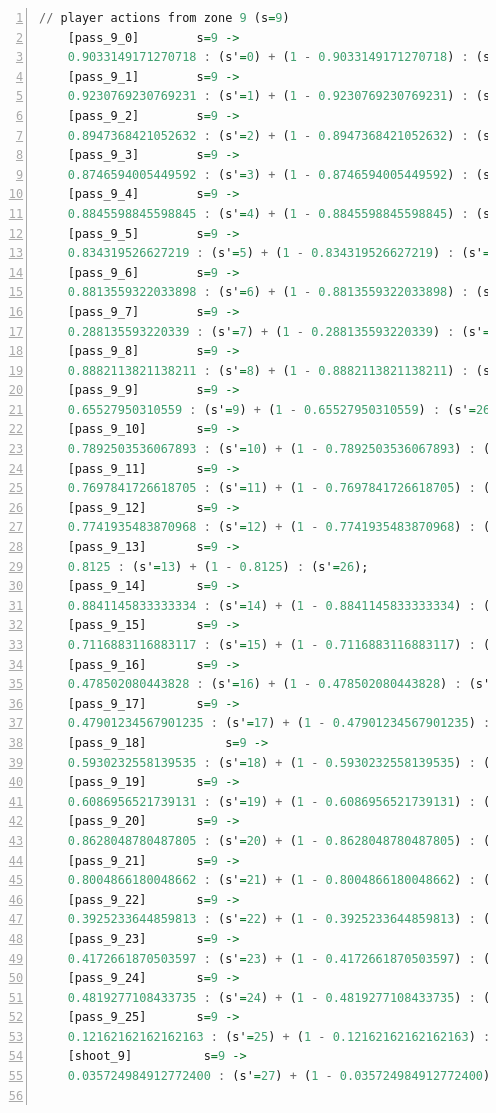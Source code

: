 \documentclass{l4proj}
\begin{document}
\begin{appendices}
\begin{lstlisting}[language=Haskell, numbers=left, caption=MDP used for strategy generation. This is the model specification as-is after the refinements at the end of chapter 3.]
	// player actions from zone 9 (s=9)
	[pass_9_0]	      s=9 ->
	0.9033149171270718 : (s'=0) + (1 - 0.9033149171270718) : (s'=26);
	[pass_9_1]	      s=9 ->
	0.9230769230769231 : (s'=1) + (1 - 0.9230769230769231) : (s'=26);
	[pass_9_2]	      s=9 ->
	0.8947368421052632 : (s'=2) + (1 - 0.8947368421052632) : (s'=26);
	[pass_9_3]	      s=9 ->
	0.8746594005449592 : (s'=3) + (1 - 0.8746594005449592) : (s'=26);
	[pass_9_4]	      s=9 ->
	0.8845598845598845 : (s'=4) + (1 - 0.8845598845598845) : (s'=26);
	[pass_9_5]	      s=9 ->
	0.834319526627219 : (s'=5) + (1 - 0.834319526627219) : (s'=26);
	[pass_9_6]	      s=9 ->
	0.8813559322033898 : (s'=6) + (1 - 0.8813559322033898) : (s'=26);
	[pass_9_7]	      s=9 ->
	0.288135593220339 : (s'=7) + (1 - 0.288135593220339) : (s'=26);
	[pass_9_8]	      s=9 ->
	0.8882113821138211 : (s'=8) + (1 - 0.8882113821138211) : (s'=26);
	[pass_9_9]	      s=9 ->
	0.65527950310559 : (s'=9) + (1 - 0.65527950310559) : (s'=26);
	[pass_9_10]	      s=9 ->
	0.7892503536067893 : (s'=10) + (1 - 0.7892503536067893) : (s'=26);
	[pass_9_11]	      s=9 ->
	0.7697841726618705 : (s'=11) + (1 - 0.7697841726618705) : (s'=26);
	[pass_9_12]	      s=9 ->
	0.7741935483870968 : (s'=12) + (1 - 0.7741935483870968) : (s'=26);
	[pass_9_13]	      s=9 ->
	0.8125 : (s'=13) + (1 - 0.8125) : (s'=26);
	[pass_9_14]	      s=9 ->
	0.8841145833333334 : (s'=14) + (1 - 0.8841145833333334) : (s'=26);
	[pass_9_15]	      s=9 ->
	0.7116883116883117 : (s'=15) + (1 - 0.7116883116883117) : (s'=26);
	[pass_9_16]	      s=9 ->
	0.478502080443828 : (s'=16) + (1 - 0.478502080443828) : (s'=26);
	[pass_9_17]	      s=9 ->
	0.47901234567901235 : (s'=17) + (1 - 0.47901234567901235) : (s'=26);
	[pass_9_18]           s=9 ->
	0.5930232558139535 : (s'=18) + (1 - 0.5930232558139535) : (s'=26);
	[pass_9_19]	      s=9 ->
	0.6086956521739131 : (s'=19) + (1 - 0.6086956521739131) : (s'=26);
	[pass_9_20]	      s=9 ->
	0.8628048780487805 : (s'=20) + (1 - 0.8628048780487805) : (s'=26);
	[pass_9_21]	      s=9 ->
	0.8004866180048662 : (s'=21) + (1 - 0.8004866180048662) : (s'=26);
	[pass_9_22]	      s=9 ->
	0.3925233644859813 : (s'=22) + (1 - 0.3925233644859813) : (s'=26);
	[pass_9_23]	      s=9 ->
	0.4172661870503597 : (s'=23) + (1 - 0.4172661870503597) : (s'=26);
	[pass_9_24]	      s=9 ->
	0.4819277108433735 : (s'=24) + (1 - 0.4819277108433735) : (s'=26);
	[pass_9_25]	      s=9 ->
	0.12162162162162163 : (s'=25) + (1 - 0.12162162162162163) : (s'=26);
	[shoot_9]	       s=9 ->
	0.035724984912772400 : (s'=27) + (1 - 0.035724984912772400) : (s'=26);


\end{lstlisting}
\end{appendices}
\end{document}
